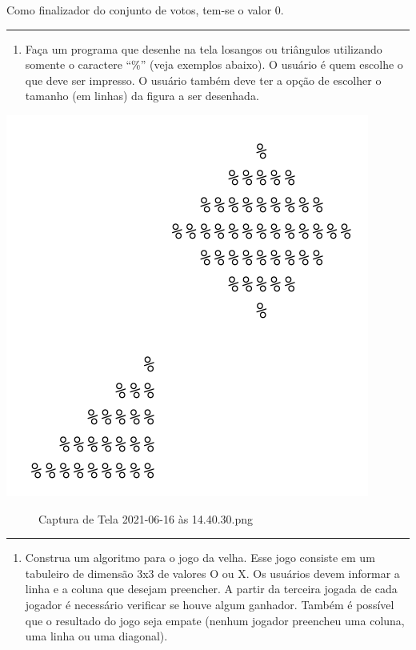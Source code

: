 \documentclass[12pt,a4paper]{article}
\providecommand{\tightlist}{%
      \setlength{\itemsep}{0pt}\setlength{\parskip}{0pt}}
\begin{document}
Como finalizador do conjunto de votos, tem-se o valor 0.

    \begin{center}\rule{0.5\linewidth}{0.5pt}\end{center}

\begin{enumerate}
\def\labelenumi{\arabic{enumi}.}
\setcounter{enumi}{10}
\tightlist
\item
  Faça um programa que desenhe na tela losangos ou triângulos utilizando
  somente o caractere ``\%'' (veja exemplos abaixo). O usuário é quem
  escolhe o que deve ser impresso. O usuário também deve ter a opção de
  escolher o tamanho (em linhas) da figura a ser desenhada.
\end{enumerate}

\includegraphics{"figs/cap4ex1.png"}

    \begin{figure}
\centering
\caption{Captura de Tela 2021-06-16 às 14.40.30.png}
\end{figure}

    \begin{center}\rule{0.5\linewidth}{0.5pt}\end{center}

\begin{enumerate}
\def\labelenumi{\arabic{enumi}.}
\setcounter{enumi}{11}
\tightlist
\item
  Construa um algoritmo para o jogo da velha. Esse jogo consiste em um
  tabuleiro de dimensão 3x3 de valores O ou X. Os usuários devem
  informar a linha e a coluna que desejam preencher. A partir da
  terceira jogada de cada jogador é necessário verificar se houve algum
  ganhador. Também é possível que o resultado do jogo seja empate
  (nenhum jogador preencheu uma coluna, uma linha ou uma diagonal).
\end{enumerate}
\end{document}
